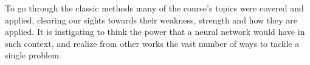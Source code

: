 \documentclass[10pt,twocolumn,letterpaper]{article}
\begin{document}
  To go through the classic methods many of the course's topics were covered and
  applied, clearing our sights towards their weakness, strength and how they are
  applied. It is instigating to think the power that a neural network would have
  in such context, and realize from other works the vast number of ways to
  tackle a single problem.

{\small


}
\end{document}
